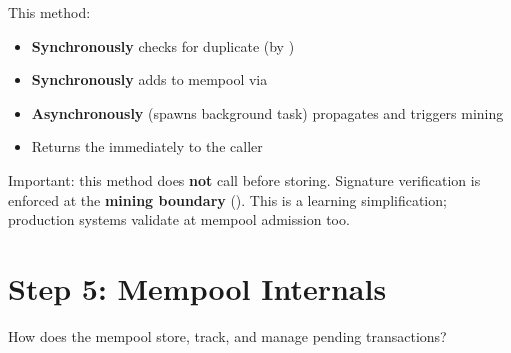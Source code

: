 \begin{notebox}
This method:
\begin{itemize}
  \item \textbf{Synchronously} checks for duplicate (by )
  \item \textbf{Synchronously} adds to mempool via 
  \item \textbf{Asynchronously} (spawns background task) propagates and triggers mining
  \item Returns the  immediately to the caller
\end{itemize}

Important: this method does \textbf{not} call  before storing. Signature verification is enforced at the \textbf{mining boundary} (). This is a learning simplification; production systems validate at mempool admission too.
\end{notebox}

\section{Step 5: Mempool Internals}
\label{sec:ch09-5-step5}

How does the mempool store, track, and manage pending transactions?

